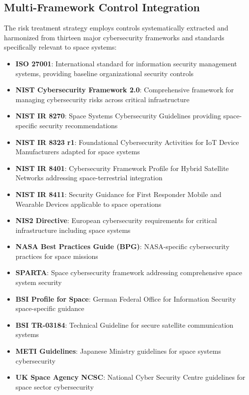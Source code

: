 \documentclass[binding=0.6cm]{sapthesis}
\begin{document}
\subsection{Multi-Framework Control Integration}

The risk treatment strategy employs controls systematically extracted and harmonized from thirteen major cybersecurity frameworks and standards specifically relevant to space systems:

\begin{itemize}
    \item \textbf{ISO 27001}: International standard for information security management systems, providing baseline organizational security controls
    \item \textbf{NIST Cybersecurity Framework 2.0}: Comprehensive framework for managing cybersecurity risks across critical infrastructure
    \item \textbf{NIST IR 8270}: Space Systems Cybersecurity Guidelines providing space-specific security recommendations
    \item \textbf{NIST IR 8323 r1}: Foundational Cybersecurity Activities for IoT Device Manufacturers adapted for space systems
    \item \textbf{NIST IR 8401}: Cybersecurity Framework Profile for Hybrid Satellite Networks addressing space-terrestrial integration
    \item \textbf{NIST IR 8411}: Security Guidance for First Responder Mobile and Wearable Devices applicable to space operations
    \item \textbf{NIS2 Directive}: European cybersecurity requirements for critical infrastructure including space systems
    \item \textbf{NASA Best Practices Guide (BPG)}: NASA-specific cybersecurity practices for space missions
    \item \textbf{SPARTA}: Space cybersecurity framework addressing comprehensive space system security
    \item \textbf{BSI Profile for Space}: German Federal Office for Information Security space-specific guidance
    \item \textbf{BSI TR-03184}: Technical Guideline for secure satellite communication systems
    \item \textbf{METI Guidelines}: Japanese Ministry guidelines for space systems cybersecurity
    \item \textbf{UK Space Agency NCSC}: National Cyber Security Centre guidelines for space sector cybersecurity
\end{itemize}
\end{document}
